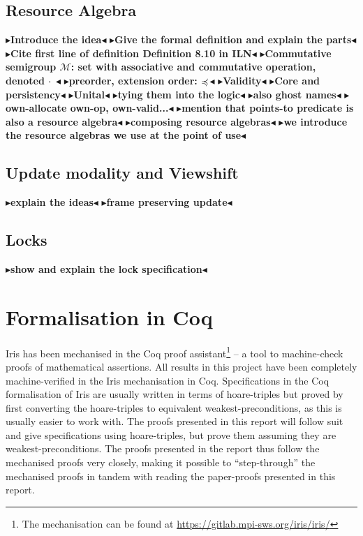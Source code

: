 \documentclass[a4paper, 10pt]{report}
\theoremstyle{definition}
\newcommand{\Ml}{\ensuremath{\mathcal{M}}}
\newcommand{\todo}[1]{{\color[rgb]{.5,0,0}\textbf{$\blacktriangleright$#1$\blacktriangleleft$}}}
\begin{document}
\subsection{Resource Algebra}
\todo{Introduce the idea}
\todo{Give the formal definition and explain the parts}
  \todo{Cite first line of definition Definition 8.10 in ILN}
  \todo{Commutative semigroup $\Ml$: set with associative and commutative operation, denoted $\mathbin{\cdot}$ }
    \todo{preorder, extension order: $\mathrel{\stackrel{}{\preccurlyeq}}$}
  \todo{Validity}
  \todo{Core and persistency}
\todo{Unital}
\todo{tying them into the logic}
  \todo{also ghost names}
  \todo{own-allocate own-op, own-valid...}
\todo{mention that points-to predicate is also a resource algebra}
\todo{composing resource algebras}
\todo{we introduce the resource algebras we use at the point of use}

\subsection{Update modality and Viewshift}
\todo{explain the ideas}
\todo{frame preserving update}


\subsection{Locks}\label{Pre:iris:locks}
\todo{show and explain the lock specification}


\section{Formalisation in Coq}
\label{Pre:section:coq}

Iris has been mechanised in the Coq proof assistant\footnote{The mechanisation can be found at \url{https://gitlab.mpi-sws.org/iris/iris/}} -- a tool to machine-check proofs of mathematical assertions. All results in this project have been completely machine-verified in the Iris mechanisation in Coq. Specifications in the Coq formalisation of Iris are usually written in terms of hoare-triples but proved by first converting the hoare-triples to equivalent weakest-preconditions, as this is usually easier to work with. The proofs presented in this report will follow suit and give specifications using hoare-triples, but prove them assuming they are weakest-preconditions. The proofs presented in the report thus follow the mechanised proofs very closely, making it possible to ``step-through'' the mechanised proofs in tandem with reading the paper-proofs presented in this report.
\end{document}
